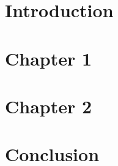 \documentclass[11pt]{article}
\begin{document}
\renewcommand{\tablename}{Table}

\thispagestyle{empty}


\newpage
{}



\newpage


\tableofcontents
\newpage



\renewcommand{\listfigurename}{List of Figures}
\listoffigures
\newpage


\renewcommand{\listtablename}{List of Tables} 
\listoftables
\newpage




\section{Introduction}\label{sec:introduction}
  
  \newpage

 \section{Chapter 1}\label{sec:chap1}
   
   \newpage

 \section{Chapter 2}\label{sec:chap2}
   
   \newpage

   \section{Conclusion}\label{sec:chap2}
   
   \newpage

%

	
\end{document}
